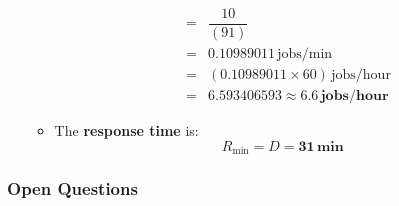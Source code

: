 \begin{enumerate}
\begin{itemize}
\begin{equation*}
\begin{array}{rcl}
                &=& \dfrac{10}{\left(91\right)} \\ [1.3em]
                &=& 0.10989011 \, \text{jobs/min} \\ [.5em]
                &=& \left(0.10989011 \times 60\right) \, \text{jobs/hour} \\ [.5em]
                &=& 6.593406593 \approx \mathbf{6.6} \, \textbf{jobs/hour}
            \end{array}
        \end{equation*}
        \item The \textbf{response time} is:
        \begin{equation*}
            R_{\min} = D = \mathbf{31} \, \textbf{min}
        \end{equation*}
    \end{itemize}
\end{enumerate}

\newpage

\subsubsection*{Open Questions}

